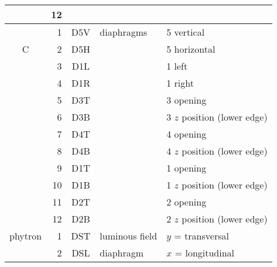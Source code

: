 \documentclass[10pt]{article}
\newcommand{\<}{$<$}
\renewcommand{\>}{\/$>$}
\begin{document}
\begin{tabular}{c|rc|ll}
            \cline{2-5}
            & 12 &\sf     &                &              \\
\hline \hline
            &  1 &\sf D5V & diaphragms     & 5 vertical \\
 \textsf{C} &  2 &\sf D5H &                & 5 horizontal \\
            &  3 &\sf D1L &                & 1 left \\
            &  4 &\sf D1R &                & 1 right \\
            &  5 &\sf D3T &                & 3 opening \\
            &  6 &\sf D3B &                & 3 $z$ position (lower edge) \\
            &  7 &\sf D4T &                & 4 opening \\
            &  8 &\sf D4B &                & 4 $z$ position (lower edge) \\
            &  9 &\sf D1T &                & 1 opening \\
            & 10 &\sf D1B &                & 1 $z$ position (lower edge) \\
            & 11 &\sf D2T &                & 2 opening \\
            & 12 &\sf D2B &                & 2 $z$ position (lower edge) \\
\hline \hline
 phytron    &  1 &\sf DST & luminous field & $y$ = transversal \\
            &  2 &\sf DSL & diaphragm      & $x$ = longitudinal \\
\hline \hline
\end{tabular}
\end{document}
